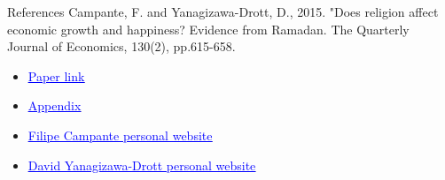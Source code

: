 \documentclass[pdftex,12pt,xcolor=pdftex,table]{beamer}
\begin{document}
    
\begin{frame}{References}
    Campante, F. and Yanagizawa-Drott, D., 2015. "Does religion affect economic growth and happiness? Evidence from Ramadan. The Quarterly Journal of Economics, 130(2), pp.615-658.
    \begin{itemize}
        \item \href{http://qje.oxfordjournals.org/content/130/2/615.full.pdf+html}{\textcolor{blue}{\underline{Paper link}}}
        \item \href{https://yanagizawadrott.com/wp-content/uploads/2016/02/rwandadyd_appendix_aug2014.pdf}{\textcolor{blue}{\underline{Appendix}}}
        \item \href{https://sites.google.com/view/prof-filipe-campante/home}{\textcolor{blue}{\underline{Filipe Campante personal website}}}
        \item \href{https://yanagizawadrott.com/}{\textcolor{blue}{\underline{David Yanagizawa-Drott personal website}}}
    \end{itemize}
\end{frame}
\end{document}
